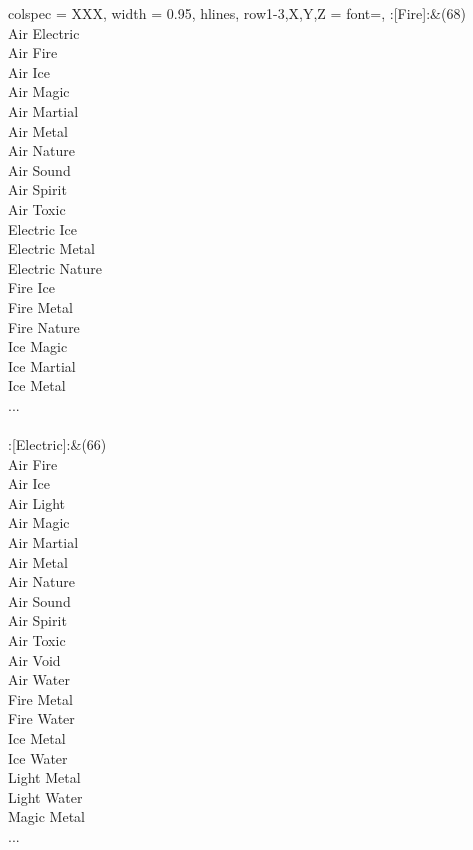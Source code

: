 \twocolumn
\begin{longtblr}[
	caption = {1v2 Attacking Effective},
	label = {1v2-Attacking-Effective},
]{
	colspec = {XXX}, width = 0.95\linewidth,
	hlines,
	row{1-3,X,Y,Z} = {font=\bfseries},
}
	:[Fire]:&{(68)\\
	Air Electric \\
	Air Fire \\
	Air Ice \\
	Air Magic \\
	Air Martial \\
	Air Metal \\
	Air Nature \\
	Air Sound \\
	Air Spirit \\
	Air Toxic \\
	Electric Ice \\
	Electric Metal \\
	Electric Nature \\
	Fire Ice \\
	Fire Metal \\
	Fire Nature \\
	Ice Magic \\
	Ice Martial \\
	Ice Metal \\
	...\\
	}\\

	:[Electric]:&{(66)\\
	Air Fire \\
	Air Ice \\
	Air Light \\
	Air Magic \\
	Air Martial \\
	Air Metal \\
	Air Nature \\
	Air Sound \\
	Air Spirit \\
	Air Toxic \\
	Air Void \\
	Air Water \\
	Fire Metal \\
	Fire Water \\
	Ice Metal \\
	Ice Water \\
	Light Metal \\
	Light Water \\
	Magic Metal \\
	...\\
	}\\


\end{longtblr}

